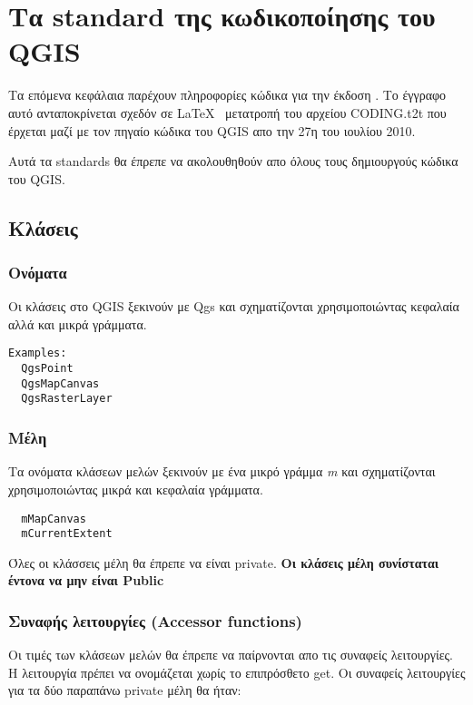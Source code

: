 

\hypertarget{toc1}{}
\section{Τα standard της κωδικοποίησης του QGIS}

Τα επόμενα κεφάλαια παρέχουν πληροφορίες κώδικα για την έκδοση \CURRENT.
Το έγγραφο αυτό ανταποκρίνεται σχεδόν σε \LaTeX~ μετατροπή του αρχείου CODING.t2t
που έρχεται μαζί με τον πηγαίο κώδικα του QGIS απο την 27η του ιουλίου 2010. 

Αυτά τα standards θα έπρεπε να ακολουθηθούν απο όλους τους δημιουργούς κώδικα του QGIS.

\hypertarget{toc2}{}
\subsection{Κλάσεις}
\hypertarget{toc3}{}
\subsubsection{Ονόματα}
Οι κλάσεις στο QGIS ξεκινούν με Qgs και σχηματίζονται χρησιμοποιώντας κεφαλαία αλλά και μικρά γράμματα. 

\begin{verbatim}
Examples:
  QgsPoint
  QgsMapCanvas
  QgsRasterLayer
\end{verbatim}

\hypertarget{toc4}{}
\subsubsection{Μέλη}
Τα ονόματα κλάσεων μελών ξεκινούν με ένα μικρό γράμμα \textit{m} και σχηματίζονται χρησιμοποιώντας μικρά και κεφαλαία γράμματα.

\begin{verbatim}
  mMapCanvas  
  mCurrentExtent
\end{verbatim}

Όλες οι κλάσσεις μέλη θα έπρεπε να είναι private.
\textbf{Οι κλάσεις μέλη συνίσταται έντονα να μην είναι Public}

\hypertarget{toc5}{}
\subsubsection{Συναφής λειτουργίες (Accessor functions)}
Οι τιμές των κλάσεων μελών θα έπρεπε να παίρνονται απο τις συναφείς λειτουργίες. Η λειτουργία πρέπει να ονομάζεται χωρίς το επιπρόσθετο get. Οι συναφείς λειτουργίες για τα δύο παραπάνω private  μέλη θα ήταν: 

